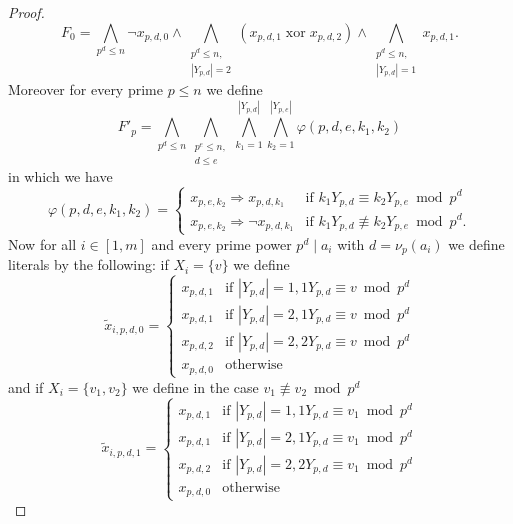 \documentclass{article}
\DeclareMathOperator{\xor}{xor}
\begin{document}
\begin{proof}
\begin{displaymath}
F_0 = \bigwedge_{p^d \leq n} \neg x_{p,d,0} \land \bigwedge_{\substack{p^d \leq n, \\|Y_{p,d}| = 2}} (x_{p,d,1} \xor x_{p,d,2}) \land \bigwedge_{\substack{p^d \leq n, \\|Y_{p,d}| = 1}} x_{p,d,1}.
\end{displaymath}
Moreover for every prime $p \leq n$ we define
\begin{displaymath}
F'_p = \bigwedge_{p^d \leq n} \bigwedge_{\substack{p^e \leq n,\\d \leq e}} \bigwedge_{k_1=1}^{|Y_{p,d}|} \bigwedge_{k_2=1}^{|Y_{p,e}|} \varphi(p,d,e,k_1,k_2)
\end{displaymath}
in which we have
\begin{displaymath}
\varphi(p,d,e,k_1,k_2) = \begin{cases}
x_{p,e,k_2} \Rightarrow x_{p,d,k_1} & \text{if } k_1Y_{p,d} \equiv k_2Y_{p,e} \bmod p^d\\
x_{p,e,k_2} \Rightarrow \neg x_{p,d,k_1} & \text{if } k_1Y_{p,d} \not \equiv k_2Y_{p,e} \bmod p^d.
\end{cases}
\end{displaymath}
Now for all $i \in [1,m]$ and every prime power $p^d \mid a_i$ with $d = \nu_p(a_i)$ we define literals by the following: if $X_i = \{v\}$ we define
\begin{displaymath}
\tilde{x}_{i,p,d,0} = \begin{cases}
x_{p,d,1} & \text{if } |Y_{p,d}|=1,1Y_{p,d} \equiv v \bmod p^d\\
x_{p,d,1} & \text{if } |Y_{p,d}|=2,1Y_{p,d} \equiv v \bmod p^d\\
x_{p,d,2} & \text{if } |Y_{p,d}|=2,2Y_{p,d} \equiv v \bmod p^d\\
x_{p,d,0} & \text{otherwise}
\end{cases}
\end{displaymath}
and if $X_i = \{v_1,v_2\}$ we define in the case $v_1 \not \equiv v_2 \bmod p^d$
\begin{displaymath}
\tilde{x}_{i,p,d,1} = \begin{cases}
x_{p,d,1} & \text{if } |Y_{p,d}|=1,1Y_{p,d} \equiv v_1 \bmod p^d\\
x_{p,d,1} & \text{if } |Y_{p,d}|=2,1Y_{p,d} \equiv v_1 \bmod p^d\\
x_{p,d,2} & \text{if } |Y_{p,d}|=2,2Y_{p,d} \equiv v_1 \bmod p^d\\
x_{p,d,0} & \text{otherwise}
\end{cases}

\end{displaymath}
\end{proof}
\end{document}
